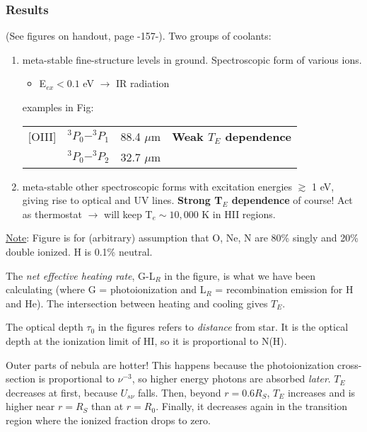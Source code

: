 \documentclass[11pt]{article}
\newcommand{\mar}[1]{\hspace{0pt}\marginpar{-\textcolor{black}{#1}-}}
\begin{document}
\subsubsection{Results}
\mar{156}(See figures on handout, page -157-).
Two groups of coolants:
\begin{enumerate}
    \item meta-stable fine-structure levels in ground.
        Spectroscopic form of various ions.
        \begin{itemize}
            \item E$_{ex} < 0.1$ eV $\rightarrow$ IR radiation
        \end{itemize}
        examples in Fig:
        \begin{center}
            \begin{tabular}{c c c c}
                [OIII] & $^{3}P_{0} - ^{3}P_{1}$ & 88.4 $\mu$m
                & \textbf{Weak $T_{E}$ dependence}\\
                       & $^{3}P_{0} - ^{3}P_{2}$ & 32.7 $\mu$m & \\
            \end{tabular}
        \end{center}
    \item meta-stable other spectroscopic forms with excitation energies
        $\gtrsim$ 1 eV, giving rise to optical and UV lines.
        \textbf{Strong T$_{E}$ dependence} of course! Act as thermostat
        $\rightarrow$ will keep T$_{e} \sim 10,000$ K in HII regions.
\end{enumerate}

\underline{Note}:
Figure is for (arbitrary) assumption that O, Ne, N are 80\% singly and
20\% double ionized. H is 0.1\% neutral.

The \textit{net effective heating rate}, G-L$_{R}$ in the figure, is what we
have been calculating (where G = photoionization and L$_{R}$ = recombination
emission for H and He).
The intersection between heating and cooling gives $T_{E}$.

The optical depth $\tau_{0}$ in the figures refers to \emph{distance}
from star. It is the optical depth at the ionization limit of HI, so
it is proportional to N(H).

Outer parts of nebula are hotter! \mar{158}This happens because the
photoionization cross-section is proportional to $\nu^{-3}$, so higher energy
photons are absorbed \emph{later}. $T_{E}$ decreases at first, because
$U_{s\nu}$ falls. Then, beyond $r = 0.6R_{S}$, $T_{E}$ increases and is higher
near $r = R_{S}$ than at $r = R_{0}$. Finally, it decreases again in the
transition region where the ionized fraction drops to zero.
\end{document}
